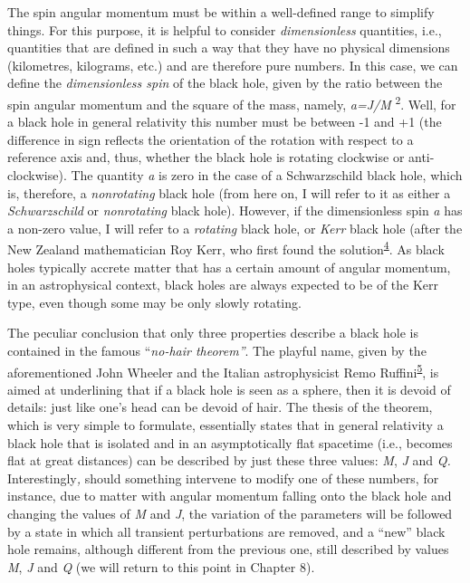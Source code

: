The spin angular momentum must be within a well-defined range to simplify things. For
this purpose, it is helpful to consider \emph{dimensionless} quantities, i.e.,
quantities that are defined in such a way that they have no physical dimensions
(kilometres, kilograms, etc.) and are therefore pure numbers. In this case, we can
define the \emph{dimensionless spin} of the black hole, given by the ratio between the
spin angular momentum and the square of the mass, namely, \emph{a=J/M}
\textsuperscript{2}. Well, for a black hole in general relativity this number must be
between -1 and +1 (the difference in sign reflects the orientation of the rotation with
respect to a reference axis and, thus, whether the black hole is rotating clockwise or
anti-clockwise). The quantity \emph{a} is zero in the case of a Schwarzschild black
hole, which is, therefore, a \emph{nonrotating} black
hole (from here on, I will refer to it as either a
\emph{Schwarzschild} or \emph{nonrotating} black hole). However, if the dimensionless
spin \emph{a} has a non-zero value, I will refer to a \emph{rotating} black
hole, or \emph{Kerr} black hole (after the New
Zealand mathematician Roy Kerr, who first found the solution\textsuperscript{\hyperlink{note:06-04}{4}}. As black
holes typically accrete matter that has a certain amount of angular momentum, in an
astrophysical context, black holes are always expected to be of the Kerr type, even
though some may be only slowly rotating.

The peculiar conclusion that only three properties describe a black hole is contained in
the famous ``\emph{no-hair theorem''}. The playful name, given by the aforementioned
John Wheeler and the Italian astrophysicist Remo
Ruffini\textsuperscript{\hyperlink{note:06-05}{5}}, is aimed at underlining that if a black
hole is seen as a sphere, then it is devoid of details: just like one's head can be
devoid of hair. The thesis of the theorem, which is very simple to
formulate, essentially states that in general relativity a black hole that is isolated
and in an asymptotically flat spacetime (i.e., becomes flat at great distances) can be
described by just these three values: \emph{M}, \emph{J} and \emph{Q.}
Interestingly\emph{,} should something intervene to modify one of these numbers, for
instance, due to matter with angular momentum falling onto the black hole and changing
the values of \emph{M} and \emph{J}, the variation of the parameters will be followed by
a state in which all transient perturbations are removed, and a ``new'' black hole
remains, although different from the previous one, still described by values \emph{M},
\emph{J} and \emph{Q} (we will return to this point in Chapter 8).

